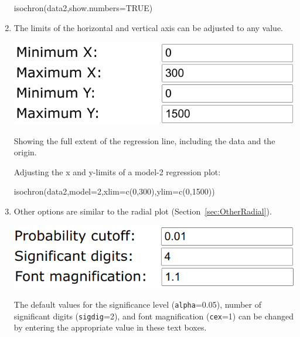 \begin{refsection}
\begin{enumerate}
\begin{console}
isochron(data2,show.numbers=TRUE)
\end{console}

\item The limits of the horizontal and vertical axis can be adjusted
  to any value.

\noindent\begin{minipage}[t]{.45\linewidth}
  \strut\vspace*{-\baselineskip}\newline
  \includegraphics[width=\linewidth]{../figures/OtherRegressionXYlims.png}
\end{minipage}
\begin{minipage}[t]{.55\linewidth}
Showing the full extent of the regression line, including the data and
the origin.
\end{minipage}

Adjusting the x and y-limits of a model-2 regression plot:

\begin{console}
isochron(data2,model=2,xlim=c(0,300),ylim=c(0,1500))
\end{console}

\item Other options are similar to the radial plot
  (Section~\ref{sec:OtherRadial}).

\noindent\begin{minipage}[t]{.45\linewidth}
  \strut\vspace*{-\baselineskip}\newline
  \includegraphics[width=\linewidth]{../figures/OtherRegressionAlpha.png}
\end{minipage}
\begin{minipage}[t]{.55\linewidth}
  The default values for the significance level (\texttt{alpha}=0.05),
  number of significant digits (\texttt{sigdig}=2), and font
  magnification (\texttt{cex}=1) can be changed by entering the
  appropriate value in these text boxes.
\end{minipage}


\end{enumerate}
\end{refsection}
